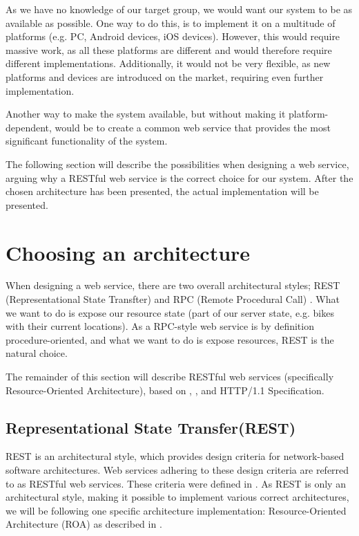 As we have no knowledge of our target group, we would want our system to be as available as possible.
One way to do this, is to implement it on a multitude of platforms (e.g. PC, Android devices, iOS devices).
However, this would require massive work, as all these platforms are different and would therefore require different implementations.
Additionally, it would not be very flexible, as new platforms and devices are introduced on the market, requiring even further implementation.

Another way to make the system available, but without making it platform-dependent, would be to create a common web service that provides the most significant functionality of the system.

The following section will describe the possibilities when designing a web service, arguing why a RESTful web service is the correct choice for our system.
After the chosen architecture has been presented, the actual implementation will be presented.

\section{Choosing an architecture}
When designing a web service, there are two overall architectural styles; REST (Representational State Transfter) and RPC (Remote Procedural Call) \cite{restful_web_services}.
What we want to do is expose our resource state (part of our server state, e.g. bikes with their current locations).
As a RPC-style web service is by definition procedure-oriented, and what we want to do is expose resources, REST is the natural choice.

The remainder of this section will describe RESTful web services (specifically Resource-Oriented Architecture), based on \citet{restful_web_services}, \citet{fielding_dissertation}, and HTTP/1.1 Specification\cite{http_specification}.

\subsection{Representational State Transfer(REST)}
REST is an architectural style, which provides design criteria for network-based software architectures.
Web services adhering to these design criteria are referred to as RESTful web services.
These criteria were defined in \citet{fielding_dissertation}.
As REST is only an architectural style, making it possible to implement various correct architectures, we will be following one specific architecture implementation: Resource-Oriented Architecture (ROA) as described in \citet{restful_web_services}.

